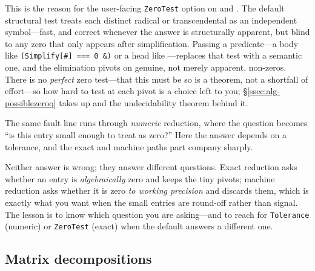 This is the reason for the user-facing \texttt{ZeroTest} option on 
and . The default
structural test treats each distinct radical or transcendental as an independent
symbol---fast, and correct whenever the answer is structurally apparent, but blind
to any zero that only appears after simplification. Passing a predicate---a body
like \texttt{(Simplify[\#] === 0 \&)} or a head like ---replaces
that test with a semantic one, and the elimination pivots on genuine, not merely
apparent, non-zeros. There is no \emph{perfect} zero test---that this must be so is a
theorem, not a shortfall of effort---so how hard to test at each pivot is a choice left to
you; \S\ref{ssec:alg-possiblezeroq} takes up  and the undecidability
theorem behind it.

The same fault line runs through \emph{numeric} reduction, where the question
becomes ``is this entry small enough to treat as zero?'' Here the answer depends on
a tolerance, and the exact and machine paths part company sharply.

\begin{codepairs}
\end{codepairs}

Neither answer is wrong; they answer different questions. Exact reduction asks
whether an entry is \emph{algebraically} zero and keeps the tiny pivots; machine
reduction asks whether it is zero \emph{to working precision} and discards them,
which is exactly what you want when the small entries are round-off rather than
signal. The lesson is to know which question you are asking---and to reach for
\texttt{Tolerance} (numeric) or \texttt{ZeroTest} (exact) when the default answers
a different one.

\subsection{Matrix decompositions}
\label{ssec:la-decomp}

